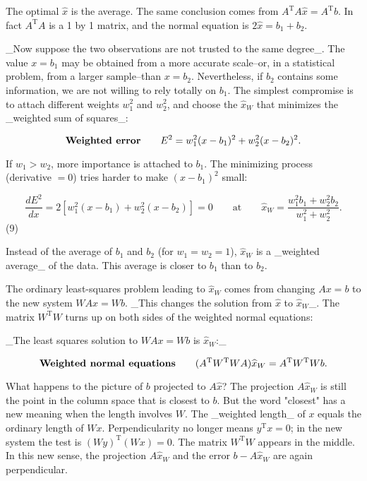 The optimal \(\widehat{x}\) is the average. The same conclusion comes from \(A^{\mathrm{T}}A\widehat{x}=A^{\mathrm{T}}b\). In fact \(A^{\mathrm{T}}A\) is a 1 by 1 matrix, and the normal equation is \(2\widehat{x}=b_{1}+b_{2}\).

_Now suppose the two observations are not trusted to the same degree_. The value \(x=b_{1}\) may be obtained from a more accurate scale--or, in a statistical problem, from a larger sample--than \(x=b_{2}\). Nevertheless, if \(b_{2}\) contains some information, we are not willing to rely totally on \(b_{1}\). The simplest compromise is to attach different weights \(w_{1}^{2}\) and \(w_{2}^{2}\), and choose the \(\widehat{x}_{W}\) that minimizes the _weighted sum of squares_:

\[\mbox{\bf Weighted error}\qquad E^{2}=w_{1}^{2}(x-b_{1})^{2}+w_{2}^{2}(x-b_{2}) ^{2}.\]

If \(w_{1}>w_{2}\), more importance is attached to \(b_{1}\). The minimizing process (derivative \(=0\)) tries harder to make \((x-b_{1})^{2}\) small:

\[\frac{dE^{2}}{dx}=2\left[w_{1}^{2}(x-b_{1})+w_{2}^{2}(x-b_{2})\right]=0\qquad \mbox{at}\qquad\widehat{x}_{W}=\frac{w_{1}^{2}b_{1}+w_{2}^{2}b_{2}}{w_{1}^{2} +w_{2}^{2}}.\] (9)

Instead of the average of \(b_{1}\) and \(b_{2}\) (for \(w_{1}=w_{2}=1\)), \(\widehat{x}_{W}\) is a _weighted average_ of the data. This average is closer to \(b_{1}\) than to \(b_{2}\).

The ordinary least-squares problem leading to \(\widehat{x}_{W}\) comes from changing \(Ax=b\) to the new system \(WAx=Wb\). _This changes the solution from \(\widehat{x}\) to \(\widehat{x}_{W}\)_. The matrix \(W^{\mathrm{T}}W\) turns up on both sides of the weighted normal equations:

_The least squares solution to \(WAx=Wb\) is \(\widehat{x}_{W}\):_

\[\mbox{\bf Weighted normal equations}\qquad(A^{\mathrm{T}}W^{\mathrm{T}}WA) \widehat{x}_{W}=A^{\mathrm{T}}W^{\mathrm{T}}Wb.\]

What happens to the picture of \(b\) projected to \(A\widehat{x}\)? The projection \(A\widehat{x}_{W}\) is still the point in the column space that is closest to \(b\). But the word "closest" has a new meaning when the length involves \(W\). The _weighted length_ of \(x\) equals the ordinary length of \(Wx\). Perpendicularity no longer means \(y^{\mathrm{T}}x=0\); in the new system the test is \((Wy)^{\mathrm{T}}(Wx)=0\). The matrix \(W^{\mathrm{T}}W\) appears in the middle. In this new sense, the projection \(A\widehat{x}_{W}\) and the error \(b-A\widehat{x}_{W}\) are again perpendicular.

